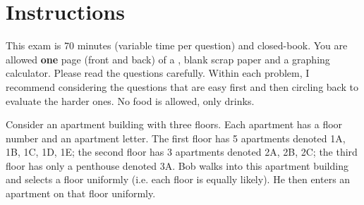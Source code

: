 \documentclass[12pt,landscape]{article}
\begin{document}
\section*{Instructions}
This exam is 70 minutes (variable time per question) and closed-book. You are allowed \textbf{one} page (front and back) of a , blank scrap paper and a graphing calculator. Please read the questions carefully. Within each problem, I recommend considering the questions that are easy first and then circling back to evaluate the harder ones. No food is allowed, only drinks. %

\pagebreak

\problem{} Consider an apartment building with three floors. Each apartment has a floor number and an apartment letter. The first floor has 5 apartments denoted 1A, 1B, 1C, 1D, 1E; the second floor has 3 apartments denoted 2A, 2B, 2C; the third floor has only a penthouse denoted 3A. Bob walks into this apartment building and selects a floor uniformly (i.e. each floor is equally likely). He then enters an apartment on that floor uniformly.
\end{document}
